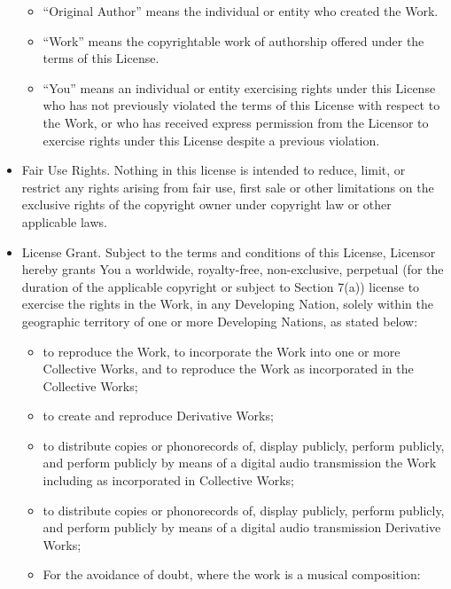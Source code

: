 \begin{itemize}
\begin{itemize}
\item ``Original Author'' means the individual or entity who created
the Work.

\item ``Work'' means the copyrightable work of authorship offered under
the terms of this License.

\item ``You'' means an individual or entity exercising rights under
this License who has not previously violated the terms of this License
with respect to the Work, or who has received express permission from
the Licensor to exercise rights under this License despite a previous
violation.\end{itemize}


\item Fair Use Rights.  Nothing in this license is intended to reduce,
limit, or restrict any rights arising from fair use, first sale or
other limitations on the exclusive rights of the copyright owner under
copyright law or other applicable laws.

\item License Grant.  Subject to the terms and conditions of this
License, Licensor hereby grants You a worldwide, royalty-free,
non-exclusive, perpetual (for the duration of the applicable copyright
or subject to Section 7(a)) license to exercise the rights in the
Work, in any Developing Nation, solely within the geographic territory
of one or more Developing Nations, as stated below:

\begin{itemize} \item to reproduce the Work, to incorporate the Work
into one or more Collective Works, and to reproduce the Work as
incorporated in the Collective Works;

\item to create and reproduce Derivative Works;

\item to distribute copies or phonorecords of, display publicly,
perform publicly, and perform publicly by means of a digital audio
transmission the Work including as incorporated in Collective Works;

\item to distribute copies or phonorecords of, display publicly,
perform publicly, and perform publicly by means of a digital audio
transmission Derivative Works;

\item

For the avoidance of doubt, where the work is a musical composition:


\end{itemize}
\end{itemize}
